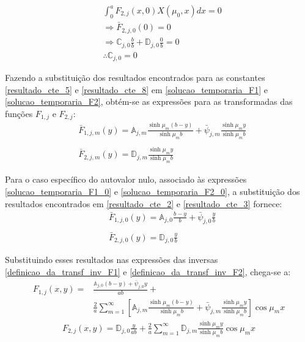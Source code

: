 \begin{align}
& \int_0^a F_{2,j}(x, 0)X(\mu_0, x)dx = 0 \nonumber \\
& \Rightarrow \bar{F}_{2,j,0}(0) = 0 \nonumber \\
& \Rightarrow \mathbb{C}_{j,0}\frac{b}{b} + \mathbb{D}_{j,0}\frac{0}{b} = 0 \nonumber \\
& \therefore \mathbb{C}_{j,0} = 0 \label{resultado_cte_3}
\end{align}

Fazendo a substituição dos resultados encontrados para as constantes \eqref{resultado_cte_5} e \eqref{resultado_cte_8}
em \eqref{solucao_temporaria_F1} e \eqref{solucao_temporaria_F2}, obtém-se as expressões para as transformadas das funções $F_{1,j}$ e $F_{2,j}$:
\begin{align}
& \bar{F}_{1,j,m}(y) = \mathbb{A}_{j,m}\frac{\sinh\mu_m (b - y)}{\sinh\mu_m b} + \bar{\psi}_{j, m}\frac{\sinh\mu_m y}{\sinh\mu_m b} \label{math_A_1} \\ \nonumber \\
& \bar{F}_{2,j,m}(y) = \mathbb{D}_{j,m}\frac{\sinh\mu_m y}{\sinh\mu_m b} \label{math_A_2}
\end{align} 

Para o caso específico do autovalor nulo, associado às expressões \eqref{solucao_temporaria_F1_0} e \eqref{solucao_temporaria_F2_0}, a substituição dos
resultados encontrados em \eqref{resultado_cte_2} e \eqref{resultado_cte_3} fornece:
\begin{align}
& \bar{F}_{1,j,0}(y) = \mathbb{A}_{j,0}\frac{b - y}{b} + \bar{\psi}_{j,0}\frac{y}{b} \label{math_A_3} \\ \nonumber \\
& \bar{F}_{2,j,0}(y) = \mathbb{D}_{j,0}\frac{y}{b} \label{math_A_4}
\end{align} 

Substituindo esses resultados
nas expressões das inversas \eqref{definicao_da_transf_inv_F1} e \eqref{definicao_da_transf_inv_F2}, chega-se a:
\begin{align}
F_{1, j}(x, y) = & \frac{\mathbb{A}_{j,0}(b - y) + \bar{\psi}_{j,0}y}{ab} + \nonumber \\
&\frac{2}{a}\sum_{m=1}^\infty\left[\mathbb{A}_{j,m}\frac{\sinh\mu_m (b - y)}{\sinh\mu_m b} + \bar{\psi}_{j, m}\frac{\sinh\mu_m y}{\sinh\mu_m b}\right]\cos\mu_m x
\label{solucao_transf_inversa_F1_com_dependencia}
\end{align}
\begin{align}
F_{2, j}(x, y) = \mathbb{D}_{j,0}\frac{y}{ab}  + \frac{2}{a}\sum_{m=1}^\infty\mathbb{D}_{j,m}\frac{\sinh\mu_m y}{\sinh\mu_m b} \cos\mu_m x
\label{solucao_transf_inversa_F2_com_dependencia}
\end{align}

